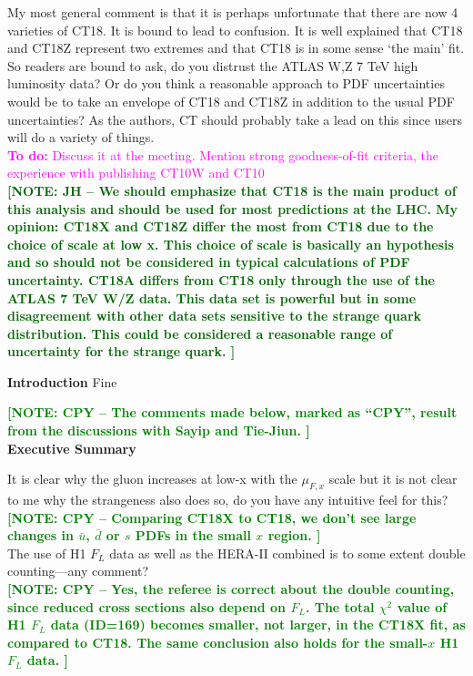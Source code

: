 \documentclass[aps,prd,amsmath,nofootinbib,floatfix,fleqn]{revtex4}
\newcommand{\TODO}[1]{\textcolor{magenta}{
\quad\vspace{3pt} \\ {\bf To do:} #1 \\
}}
\newcommand{\NOTECPY}[1]{\textcolor{green}{ \bf[NOTE: CPY -- #1 ]}}
\newcommand{\NOTEJH}[1]{\textcolor{darkgreen}{ \bf[NOTE: JH -- #1 ]}}
\begin{document}
My most general comment is that it is perhaps unfortunate that there are now 4 varieties of CT18. It is bound to lead to confusion. It is well explained that CT18 and CT18Z represent two extremes and that CT18 is in some sense ‘the main’ fit. So readers are bound to ask, do you distrust the ATLAS W,Z 7 TeV high luminosity data? Or do you think a reasonable approach to PDF uncertainties would be to take an envelope of CT18 and CT18Z in addition to the usual PDF uncertainties? As the authors, CT should probably take a lead on this since users will do a variety of things.
\TODO{Discuss it at the meeting. Mention strong goodness-of-fit criteria, the experience with publishing CT10W and CT10}
\NOTEJH{We should emphasize that CT18 is the main product of this analysis and should be used for most predictions at the LHC. My opinion: CT18X and CT18Z differ the most from CT18 due to the choice of scale at low x. This choice of scale is basically an hypothesis and so should not be considered in typical calculations of PDF uncertainty. CT18A differs from CT18 only through the use of the ATLAS 7 TeV W/Z data. This data set is powerful but in some disagreement with other data sets sensitive to the strange quark distribution. This could be considered a reasonable range of uncertainty for the strange quark.}

{\bf Introduction}
Fine


\NOTECPY{The comments made below, marked as ``CPY'', result from the discussions with Sayip and Tie-Jiun.}\\ 

{\bf Executive Summary}

It is clear why the gluon increases at low-x with the $\mu_{F,x}$ scale but it is not clear to me why the strangeness also does so, do you have any intuitive feel for this? \\
 
\NOTECPY{Comparing CT18X to CT18, we don't see large changes in ${\bar u}$, ${\bar d}$ or ${s}$ PDFs in the small $x$ region.}\\

\noindent
The use of H1 $F_L$ data as well as the HERA-II combined is to some extent double counting—any
comment? \\

\NOTECPY{Yes, the referee is correct about the double counting, since reduced cross sections also depend on $F_L$. The total $\chi^2$ value of H1 $F_L$ data (ID=169) becomes smaller, not larger, in the CT18X fit, as compared to CT18. The same conclusion also holds for the small-$x$ H1 $F_L$ data.}\\
\end{document}
